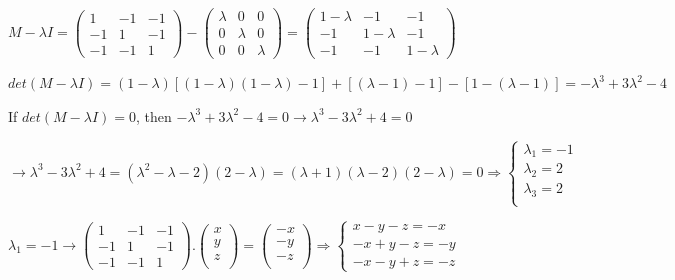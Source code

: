 \documentclass[fleqn]{article}
\begin{document}
\begin{enumerate}
      \textcolor{hwColor}{
        $
          M-\lambda I= \begin{pmatrix}
            1 & -1 & -1 \\
            -1 & 1 & -1 \\
            -1 & -1 & 1
          \end{pmatrix}-\begin{pmatrix}
            \lambda & 0 & 0 \\
            0 & \lambda & 0 \\
            0 & 0 & \lambda
          \end{pmatrix}=\begin{pmatrix}
            1-\lambda & -1 & -1 \\
            -1 & 1-\lambda & -1 \\
            -1 & -1 & 1-\lambda
          \end{pmatrix}
        $
      }

      \textcolor{hwColor}{
        $det(M-\lambda I)=(1-\lambda)\left[(1-\lambda)(1-\lambda)-1\right]+\left[(\lambda-1)-1\right]-\left[1-(\lambda-1)\right]=-\lambda^3+3\lambda^2-4$
      }

      \textcolor{hwColor}{
        If $det(M-\lambda I)=0$, then $-\lambda^3+3\lambda^2-4=0 \rightarrow \lambda^3-3\lambda^2+4=0$
      }

      \textcolor{hwColor}{
        $
        \rightarrow \lambda^3-3\lambda^2+4=(\lambda^2-\lambda-2)(2-\lambda)=(\lambda+1)(\lambda-2)(2-\lambda)=0
        \Longrightarrow 
        \begin{cases}
          \lambda_1=-1 \\
          \lambda_2=2 \\
          \lambda_3=2 \\
        \end{cases}
        $
      }

      \textcolor{hwColor}{
        $
        \lambda_1=-1 \rightarrow
        \begin{pmatrix}
          1 & -1 & -1 \\
          -1 & 1 & -1 \\
          -1 & -1 & 1
        \end{pmatrix}.\begin{pmatrix}
          x \\
          y \\
          z \\
        \end{pmatrix}=\begin{pmatrix}
          -x \\
          -y \\
          -z \\
        \end{pmatrix}
        \Longrightarrow
        \begin{cases}
          x-y-z=-x \\
          -x+y-z=-y \\
          -x-y+z=-z
        \end{cases}
        $
      }


\end{enumerate}
\end{document}

